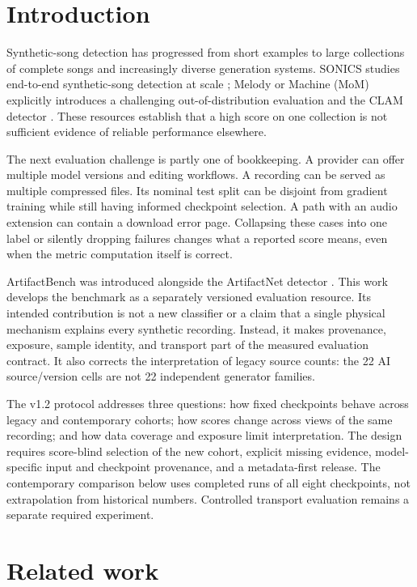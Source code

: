 \documentclass[10pt,a4paper]{article}
\begin{document}
\section{Introduction}

Synthetic-song detection has progressed from short examples to large collections
of complete songs and increasingly diverse generation systems. SONICS studies
end-to-end synthetic-song detection at scale \citep{sonics}; Melody or Machine
(MoM) explicitly introduces a challenging out-of-distribution evaluation and the
CLAM detector \citep{mom}. These resources establish that a high score on one
collection is not sufficient evidence of reliable performance elsewhere.

The next evaluation challenge is partly one of bookkeeping. A provider can
offer multiple model versions and editing workflows. A recording can be served
as multiple compressed files. Its nominal test split can be disjoint from
gradient training while still having informed checkpoint selection. A path with
an audio extension can contain a download error page. Collapsing these cases
into one label or silently dropping failures changes what a reported score
means, even when the metric computation itself is correct.

ArtifactBench was introduced alongside the ArtifactNet detector
\citep{artifactnet}. This work develops the benchmark as a separately versioned
evaluation resource. Its intended contribution is not a new classifier or a
claim that a single physical mechanism explains every synthetic recording.
Instead, it makes provenance, exposure, sample identity, and transport part of
the measured evaluation contract. It also corrects the interpretation of legacy
source counts: the 22 AI source/version cells are not 22 independent generator
families.

The v1.2 protocol addresses three questions: how fixed checkpoints behave across
legacy and contemporary cohorts; how scores change across views of the same
recording; and how data coverage and exposure limit interpretation. The design
requires score-blind selection of the new cohort, explicit missing evidence,
model-specific input and checkpoint provenance, and a metadata-first release.
The contemporary comparison below uses completed runs of all eight checkpoints,
not extrapolation from historical numbers. Controlled transport evaluation
remains a separate required experiment.

\section{Related work}
\end{document}

